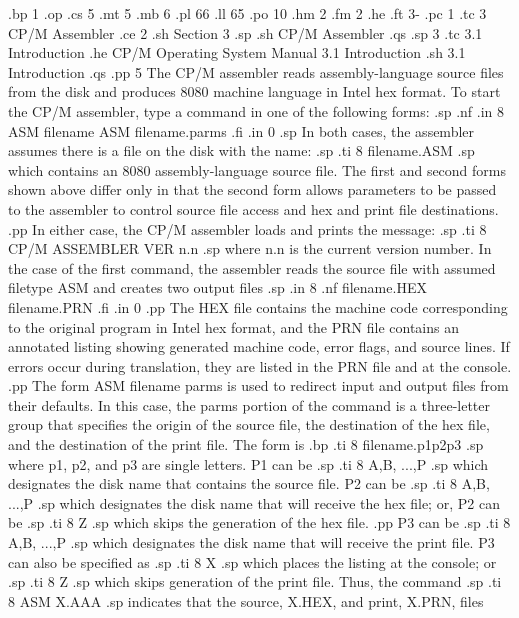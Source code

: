 .bp 1 
.op
.cs 5
.mt 5
.mb 6
.pl 66
.ll 65
.po 10
.hm 2
.fm 2
.he 
.ft                                3-%
.pc 1
.tc 3  CP/M Assembler
.ce 2
.sh
Section 3
.sp
.sh
CP/M Assembler
.qs
.sp 3
.tc    3.1  Introduction
.he CP/M Operating System Manual                    3.1  Introduction
.sh
3.1  Introduction
.qs
.pp 5
The CP/M assembler reads assembly-language source files from the 
disk and produces 8080 machine language in Intel hex format.  
To start the CP/M assembler, type a command in one of the 
following forms:
.sp 
.nf
.in 8
ASM filename
ASM filename.parms
.fi
.in 0
.sp 
In both cases, the assembler assumes there is a file on the 
disk with the name:
.sp
.ti 8
filename.ASM
.sp
which contains an 8080 assembly-language source file.  The first 
and second forms shown above differ only in that the second form 
allows parameters to be passed to the assembler to control source 
file access and hex and print file destinations.
.pp
In either case, the CP/M assembler loads and prints the message:
.sp
.ti 8
CP/M ASSEMBLER VER n.n
.sp
where n.n is the current version number.  In the case of the 
first command, the assembler reads the source file with assumed 
filetype ASM and creates two output files
.sp 
.in 8
.nf
filename.HEX
filename.PRN
.fi
.in 0
.pp
The HEX file contains the machine code corresponding to the 
original program in Intel hex format, and the PRN file contains 
an annotated listing showing generated machine code, error flags, 
and source lines.  If errors occur during translation, they are 
listed in the PRN file and at the console.
.pp
The form ASM filename parms is used to redirect input and 
output files from their defaults.  In this case, the parms 
portion of the command is a three-letter group that specifies the 
origin of the source file, the destination of the hex file, and 
the destination of the print file.  The form is
.bp
.ti 8
filename.p1p2p3
.sp
where p1, p2, and p3 are single letters.  P1 can be
.sp 
.ti 8
A,B, ...,P 
.sp
which designates the disk name that contains the source file.  P2 
can be
.sp
.ti 8
A,B, ...,P 
.sp
which designates the disk name that will receive the hex file; or, P2 
can be 
.sp
.ti 8
Z          
.sp
which skips the generation of the hex file.  
.pp
P3 can be
.sp
.ti 8
A,B, ...,P 
.sp
which designates the disk name that will receive the 
print file.  P3 can also be specified as
.sp
.ti 8
X          
.sp
which places the listing at the console; or
.sp
.ti 8
Z          
.sp
which skips generation of the print file.  Thus, the command
.sp
.ti 8
ASM X.AAA
.sp
indicates that the source, X.HEX, and print, X.PRN, files 

